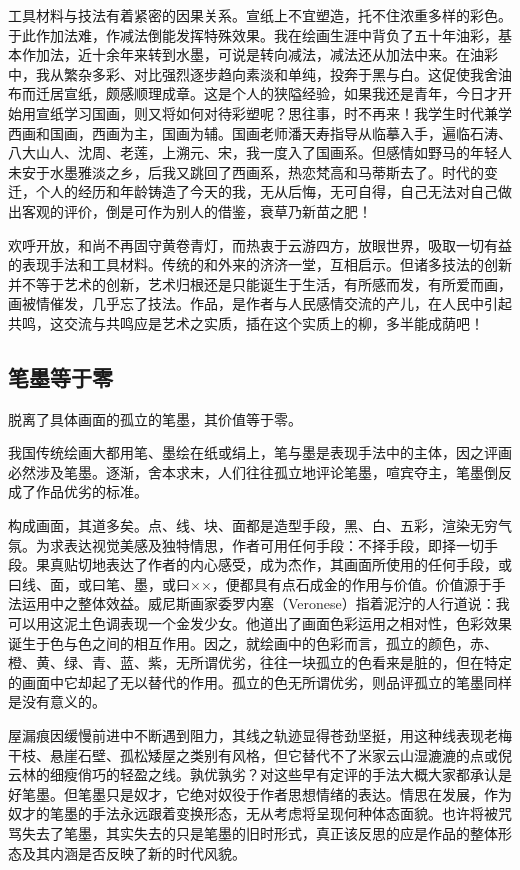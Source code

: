 \documentclass{article}
\begin{document}
工具材料与技法有着紧密的因果关系。宣纸上不宜塑造，托不住浓重多样的彩色。于此作加法难，作减法倒能发挥特殊效果。我在绘画生涯中背负了五十年油彩，基本作加法，近十余年来转到水墨，可说是转向减法，减法还从加法中来。在油彩中，我从繁杂多彩、对比强烈逐步趋向素淡和单纯，投奔于黑与白。这促使我舍油布而迁居宣纸，颇感顺理成章。这是个人的狭隘经验，如果我还是青年，今日才开始用宣纸学习国画，则又将如何对待彩塑呢？思往事，时不再来！我学生时代兼学西画和国画，西画为主，国画为辅。国画老师潘天寿指导从临摹入手，遍临石涛、八大山人、沈周、老莲，上溯元、宋，我一度入了国画系。但感情如野马的年轻人未安于水墨雅淡之乡，后我又跳回了西画系，热恋梵高和马蒂斯去了。时代的变迁，个人的经历和年龄铸造了今天的我，无从后悔，无可自得，自己无法对自己做出客观的评价，倒是可作为别人的借鉴，衰草乃新苗之肥！

欢呼开放，和尚不再固守黄卷青灯，而热衷于云游四方，放眼世界，吸取一切有益的表现手法和工具材料。传统的和外来的济济一堂，互相启示。但诸多技法的创新并不等于艺术的创新，艺术归根还是只能诞生于生活，有所感而发，有所爱而画，画被情催发，几乎忘了技法。作品，是作者与人民感情交流的产儿，在人民中引起共鸣，这交流与共鸣应是艺术之实质，插在这个实质上的柳，多半能成荫吧！
\subsection{笔墨等于零}
脱离了具体画面的孤立的笔墨，其价值等于零。

我国传统绘画大都用笔、墨绘在纸或绢上，笔与墨是表现手法中的主体，因之评画必然涉及笔墨。逐渐，舍本求末，人们往往孤立地评论笔墨，喧宾夺主，笔墨倒反成了作品优劣的标准。

构成画面，其道多矣。点、线、块、面都是造型手段，黑、白、五彩，渲染无穷气氛。为求表达视觉美感及独特情思，作者可用任何手段：不择手段，即择一切手段。果真贴切地表达了作者的内心感受，成为杰作，其画面所使用的任何手段，或曰线、面，或曰笔、墨，或曰××，便都具有点石成金的作用与价值。价值源于手法运用中之整体效益。威尼斯画家委罗内塞（Veronese）指着泥泞的人行道说：我可以用这泥土色调表现一个金发少女。他道出了画面色彩运用之相对性，色彩效果诞生于色与色之间的相互作用。因之，就绘画中的色彩而言，孤立的颜色，赤、橙、黄、绿、青、蓝、紫，无所谓优劣，往往一块孤立的色看来是脏的，但在特定的画面中它却起了无以替代的作用。孤立的色无所谓优劣，则品评孤立的笔墨同样是没有意义的。

屋漏痕因缓慢前进中不断遇到阻力，其线之轨迹显得苍劲坚挺，用这种线表现老梅干枝、悬崖石壁、孤松矮屋之类别有风格，但它替代不了米家云山湿漉漉的点或倪云林的细瘦俏巧的轻盈之线。孰优孰劣？对这些早有定评的手法大概大家都承认是好笔墨。但笔墨只是奴才，它绝对奴役于作者思想情绪的表达。情思在发展，作为奴才的笔墨的手法永远跟着变换形态，无从考虑将呈现何种体态面貌。也许将被咒骂失去了笔墨，其实失去的只是笔墨的旧时形式，真正该反思的应是作品的整体形态及其内涵是否反映了新的时代风貌。
\end{document}

